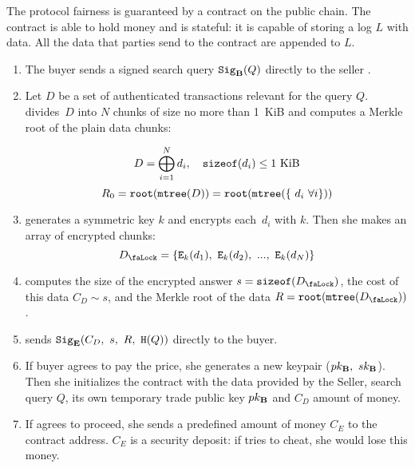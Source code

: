 The protocol fairness is guaranteed by a contract on the public chain. The contract is able to hold money and is stateful: it is capable of storing a log $L$ with data. All the data that parties send to the contract are appended to $L$.
\begin{enumerate}
\item The buyer  sends a signed search query $\mathtt{Sig}_{\mathbf{B}}(Q)$ directly to the seller .
\item Let $D$ be a set of authenticated transactions relevant for the query $Q$.  divides~$D$ into $N$ chunks of size no more than 1~KiB and computes a Merkle root of the plain data chunks:

\begin{equation}
D = \bigoplus_{i=1}^N d_i, \quad \mathtt{sizeof}(d_i) \leq 1~\mathrm{KiB}
\end{equation}
\begin{equation}
R_0 = \mathtt{root}(\mathtt{mtree}(D)) = \mathtt{root}(\mathtt{mtree}(\{\ d_i\ \forall i\}))
\end{equation}

\item {} generates a symmetric key $k$ and encrypts each~$d_i$ with $k$. Then she makes an array of encrypted chunks:
\begin{equation}
\Lock{D} = \{ \Encrypt_\Key{k}(d_1),\ \Encrypt_\Key{k}(d_2),\ ...,\ \Encrypt_\Key{k}(d_N) \}
\end{equation}

\item {} computes the size of the encrypted answer $s = \SizeOf(\Lock{D})$, the cost of this data $C_D \sim s$, and the Merkle root of the data $R = \Root(\MerkleTree(\Lock{D}))$.

\item {} sends $\Sign_\Party{E}(C_D,\ s,\ R,\ \Hash(Q))$ directly to the buyer.

\item If buyer agrees to pay the price, she generates a new keypair ($pk_{\mathbf{B}},\ sk_{\mathbf{B}}$). Then she initializes the contract with the data provided by the Seller, search query $Q$, its own temporary trade public key $pk_{\mathbf{B}}$ and $C_D$ amount of money.

\item \label{step:seller-deposits-money} If  agrees to proceed, she sends a predefined amount of money $C_E$ to the contract address. $C_E$ is a security deposit: if  tries to cheat, she would lose this money.


\end{enumerate}
